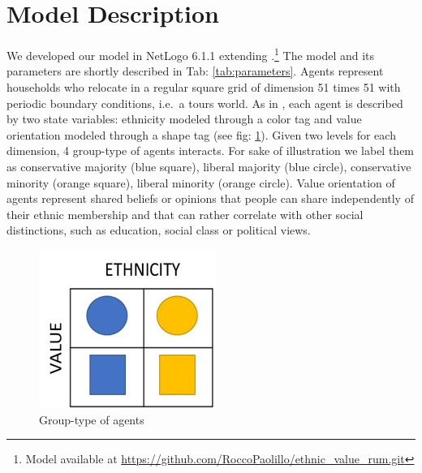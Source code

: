 \documentclass[
]{article}
\begin{document}
\hypertarget{model-description}{%
\section{Model Description}\label{model-description}}

We developed our model in NetLogo 6.1.1 \citep{wilenskynl} extending
\cite{paolillo2018}.\footnote{Model available at \url{https://github.com/RoccoPaolillo/ethnic_value_rum.git}}
The model and its parameters are shortly described in Tab:
\ref{tab:parameters}. Agents represent households who relocate in a
regular square grid of dimension 51 times 51 with periodic boundary
conditions, i.e.~a tours world. As in \cite{paolillo2018}, each agent is
described by two state variables: ethnicity modeled through a color tag
and value orientation modeled through a shape tag (see fig:
\ref{fig:model}). Given two levels for each dimension, 4 group-type of
agents interacts. For sake of illustration we label them as conservative
majority (blue square), liberal majority (blue circle), conservative
minority (orange square), liberal minority (orange circle). Value
orientation of agents represent shared beliefs or opinions that people
can share independently of their ethnic membership and that can rather
correlate with other social distinctions, such as education, social
class or political views.

\begin{figure}[h]

{\centering \includegraphics[width=0.7\linewidth]{model} 

}

\caption{Group-type of agents}\label{fig:model}
\end{figure}
\end{document}
